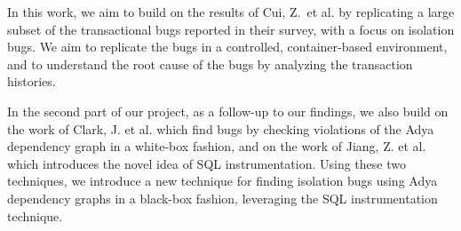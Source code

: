 In this work, we aim to build on the results of Cui, Z.\ et al. \cite{cui2024understanding_ICSE2024} by replicating a large subset of the transactional bugs reported in their survey, with a focus on isolation bugs. We aim to replicate the bugs in a controlled, container-based environment, and to understand the root cause of the bugs by analyzing the transaction histories.

In the second part of our project, as a follow-up to our findings, we also build on the work of Clark, J. et al. \cite{clark2024validating} which find bugs by checking violations of the Adya dependency graph \cite{adya1999weak} in a white-box fashion, and on the work of Jiang, Z. et al. \cite{jiang2023detecting} which introduces the novel idea of SQL instrumentation. Using these two techniques, we introduce a new technique for finding isolation bugs using Adya dependency graphs in a black-box fashion, leveraging the SQL instrumentation technique.
